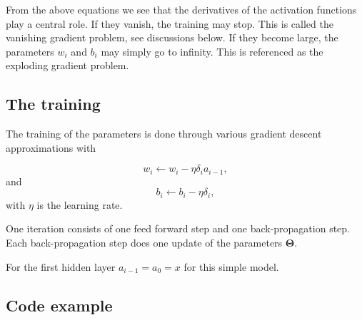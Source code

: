 \documentclass[%
oneside,                 %
final,                   %
10pt]{article}
\begin{document}
\begin{block}{}
From the above equations we see that the derivatives of the activation
functions play a central role. If they vanish, the training may
stop. This is called the vanishing gradient problem, see discussions below. If they become
large, the parameters $w_i$ and $b_i$ may simply go to infinity. This
is referenced as  the exploding gradient problem.
\end{block}

\subsection{The training}

The training of the parameters is done through various gradient descent approximations with

\[
w_{i}\leftarrow w_{i}- \eta \delta_i a_{i-1},
\]
and
\[
b_i \leftarrow b_i-\eta \delta_i,
\]
with $\eta$ is the learning rate.

One iteration consists of one feed forward step and one back-propagation step. Each back-propagation step does one update of the parameters $\bm{\Theta}$.

For the first hidden layer $a_{i-1}=a_0=x$ for this simple model.

\subsection{Code example}
\end{document}
